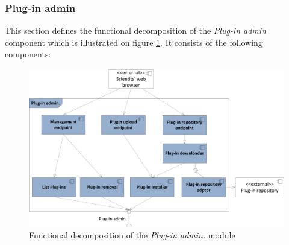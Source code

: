 \subsubsection{Plug-in admin}

This section defines the functional decomposition of the \textit{Plug-in admin} component which is illustrated on figure \ref{fig_admin_func}. It consists of the following components:

\begin{figure}[h!]
  \centering
  	\includegraphics[scale=0.75]{plug-in/layers/admin-func.png}
  \caption{Functional decomposition of the \textit{Plug-in admin.} module}
  \label{fig_admin_func}
\end{figure}

